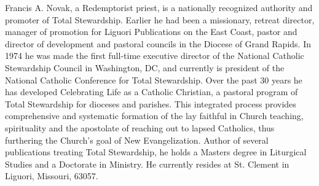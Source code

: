 \documentclass[oneside]{book}
\begin{document}
Francis A. Novak, a Redemptorist priest, is a nationally recognized authority
and promoter of Total Stewardship. Earlier he had been a missionary, retreat
director, manager of promotion for Liguori Publications on the East Coast,
pastor and director of development and pastoral councils in the Diocese of Grand
Rapids. In 1974 he was made the first full-time executive director of the
National Catholic Stewardship Council in Washington, DC, and currently is
president of the National Catholic Conference for Total Stewardship. Over the
past 30 years he has developed Celebrating Life as a Catholic Christian, a
pastoral program of Total Stewardship for dioceses and parishes. This integrated
process provides comprehensive and systematic formation of the lay faithful in
Church teaching, spirituality and the apostolate of reaching out to lapsed
Catholics, thus furthering the Church's goal of New Evangelization. Author of
several publications treating Total Stewardship, he holds a Masters degree in
Liturgical Studies and a Doctorate in Ministry. He currently resides at
St. Clement in Liguori, Missouri, 63057.

\end{document}
